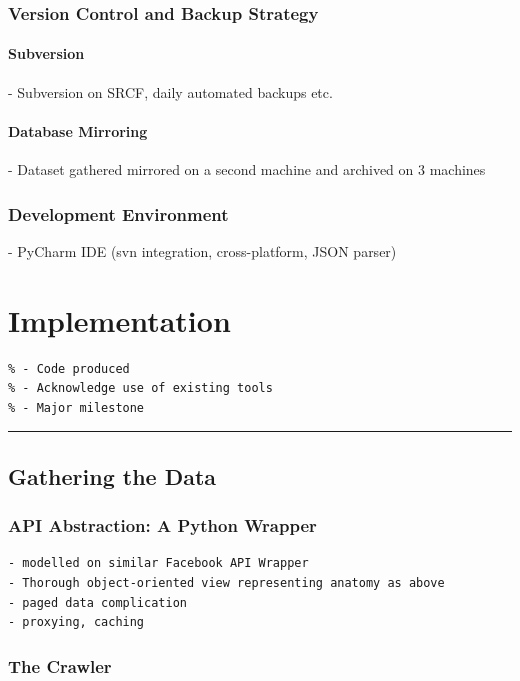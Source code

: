 \documentclass[a4paper,12pt,twoside,notitlepage]{report}
\newcommand{\rulewidth}{300pt}
\newcommand{\halfrule}{
  \begin{center}
    {\rule{\rulewidth}{0.5pt}}
  \end{center}}
\begin{document}
\subsection{Version Control and Backup Strategy}


\subsubsection{Subversion} 
- Subversion on SRCF, daily automated backups etc.

\subsubsection{Database Mirroring}
- Dataset gathered mirrored on a second machine and archived on 3 machines


\subsection{Development Environment}
- PyCharm IDE (svn integration, cross-platform, JSON parser)


\chapter{Implementation}

\begin{verbatim}
% - Code produced
% - Acknowledge use of existing tools
% - Major milestone 
\end{verbatim}

\halfrule

\section{Gathering the Data}

\subsection{API Abstraction: A Python Wrapper}

\begin{verbatim}
- modelled on similar Facebook API Wrapper
- Thorough object-oriented view representing anatomy as above
- paged data complication
- proxying, caching
\end{verbatim}

\subsection{The Crawler}
\end{document}
